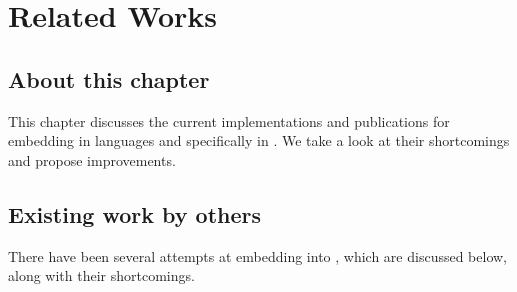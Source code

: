 \documentclass[thesis-solanki.tex]{subfiles}
\begin{document}
\chapter{Related Works}\label{chap:proposedWork}

\section{About this chapter}\label{sec:what-this-chapter:proposedWork}

This chapter discusses the current implementations and publications for embedding  in languages
and specifically in . We take a look at their shortcomings and propose improvements.


\section{Existing work by others} \label{sec:existing-work-by-others}

There have been several attempts at embedding  into , which are
discussed below, along with their shortcomings.
\end{document}
